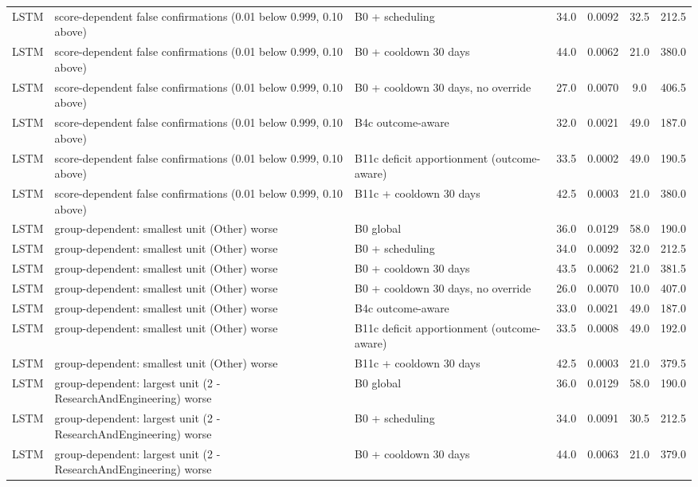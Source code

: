 \begin{longtable}{lp{5.2cm}p{4.4cm}cccc}
LSTM & score-dependent false confirmations (0.01 below 0.999, 0.10 above) & B0 + scheduling & 34.0 & 0.0092 & 32.5 & 212.5 \\
LSTM & score-dependent false confirmations (0.01 below 0.999, 0.10 above) & B0 + cooldown 30 days & 44.0 & 0.0062 & 21.0 & 380.0 \\
LSTM & score-dependent false confirmations (0.01 below 0.999, 0.10 above) & B0 + cooldown 30 days, no override & 27.0 & 0.0070 & 9.0 & 406.5 \\
LSTM & score-dependent false confirmations (0.01 below 0.999, 0.10 above) & B4c outcome-aware & 32.0 & 0.0021 & 49.0 & 187.0 \\
LSTM & score-dependent false confirmations (0.01 below 0.999, 0.10 above) & B11c deficit apportionment (outcome-aware) & 33.5 & 0.0002 & 49.0 & 190.5 \\
LSTM & score-dependent false confirmations (0.01 below 0.999, 0.10 above) & B11c + cooldown 30 days & 42.5 & 0.0003 & 21.0 & 380.0 \\
LSTM & group-dependent: smallest unit (Other) worse & B0 global & 36.0 & 0.0129 & 58.0 & 190.0 \\
LSTM & group-dependent: smallest unit (Other) worse & B0 + scheduling & 34.0 & 0.0092 & 32.0 & 212.5 \\
LSTM & group-dependent: smallest unit (Other) worse & B0 + cooldown 30 days & 43.5 & 0.0062 & 21.0 & 381.5 \\
LSTM & group-dependent: smallest unit (Other) worse & B0 + cooldown 30 days, no override & 26.0 & 0.0070 & 10.0 & 407.0 \\
LSTM & group-dependent: smallest unit (Other) worse & B4c outcome-aware & 33.0 & 0.0021 & 49.0 & 187.0 \\
LSTM & group-dependent: smallest unit (Other) worse & B11c deficit apportionment (outcome-aware) & 33.5 & 0.0008 & 49.0 & 192.0 \\
LSTM & group-dependent: smallest unit (Other) worse & B11c + cooldown 30 days & 42.5 & 0.0003 & 21.0 & 379.5 \\
LSTM & group-dependent: largest unit (2 - ResearchAndEngineering) worse & B0 global & 36.0 & 0.0129 & 58.0 & 190.0 \\
LSTM & group-dependent: largest unit (2 - ResearchAndEngineering) worse & B0 + scheduling & 34.0 & 0.0091 & 30.5 & 212.5 \\
LSTM & group-dependent: largest unit (2 - ResearchAndEngineering) worse & B0 + cooldown 30 days & 44.0 & 0.0063 & 21.0 & 379.0 \\

\end{longtable}
